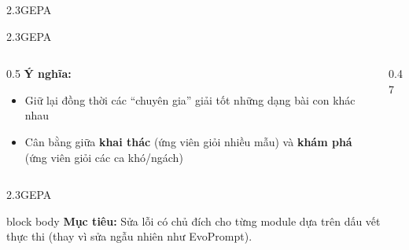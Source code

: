 \begin{frame}{2.3\quad GEPA}
  \centering{}
\end{frame}

\begin{frame}{2.3\quad GEPA}
  \begin{columns}[T,onlytextwidth]
    \begin{column}{0.5\textwidth}
      \vspace{0.4em}
      \textbf{Ý nghĩa:}
      \begin{itemize}\setlength{\itemsep}{0.6em}
        \item Giữ lại đồng thời các ``chuyên gia'' giải tốt những dạng bài con khác nhau
        \item Cân bằng giữa \textbf{khai thác} (ứng viên giỏi nhiều mẫu) và \textbf{khám
              phá} (ứng viên giỏi các ca khó/ngách)
      \end{itemize}
    \end{column}
    \begin{column}{0.47\textwidth}
      \centering{}
    \end{column}
  \end{columns}
\end{frame}

\begin{frame}{2.3\quad GEPA}
  \vspace{0.6em}
  \begin{beamercolorbox}[wd=\linewidth,sep=0.7em]{block body}
    \textbf{Mục tiêu:} Sửa lỗi có chủ đích cho từng module dựa trên dấu vết thực thi
    (thay vì sửa ngẫu nhiên như EvoPrompt).
  \end{beamercolorbox}
\end{frame}

